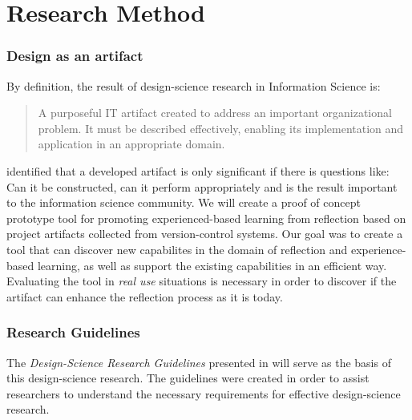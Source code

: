 %
%
\section{Research Method}


\subsubsection{Design as an artifact}
By definition, the result of design-science research in Information Science is:
\begin{quote}
A purposeful IT artifact created to address an important organizational problem. It must be described effectively, enabling its implementation and application in an appropriate domain.
\end{quote}
\cite{Markus et al. 2002} identified that a developed artifact is only significant if there is questions like: Can it be constructed, can it perform appropriately and is the result important to the information science community. 
We will create a proof of concept prototype tool for promoting experienced-based learning from reflection based on project artifacts collected from version-control systems. Our goal was to create a tool that can discover new capabilites in the domain of reflection and experience-based learning, as well as support the existing capabilities in an efficient way. Evaluating the tool in \emph{real use} situations is necessary in order to discover if the artifact can enhance the reflection process as it is today. \\

\subsubsection{Research Guidelines}
The \emph{Design-Science Research Guidelines} presented in \cite{Esearch2004} will serve as the basis of this design-science research. The guidelines were created in order to assist researchers to understand the necessary requirements for effective design-science research. 

